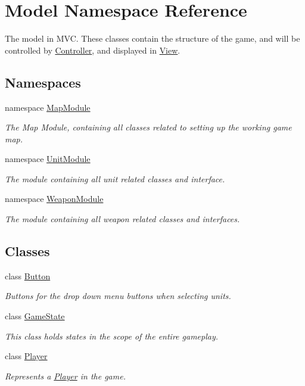 \hypertarget{namespace_model}{}\section{Model Namespace Reference}
\label{namespace_model}


The model in M\+VC. These classes contain the structure of the game, and will be controlled by \hyperlink{namespace_controller}{Controller}, and displayed in \hyperlink{namespace_view}{View}.  


\subsection*{Namespaces}
\begin{DoxyCompactItemize}
\item 
namespace \hyperlink{namespace_model_1_1_map_module}{Map\+Module}
\begin{DoxyCompactList}\small\item\em The Map Module, containing all classes related to setting up the working game map. \end{DoxyCompactList}\item 
namespace \hyperlink{namespace_model_1_1_unit_module}{Unit\+Module}
\begin{DoxyCompactList}\small\item\em The module containing all unit related classes and interface. \end{DoxyCompactList}\item 
namespace \hyperlink{namespace_model_1_1_weapon_module}{Weapon\+Module}
\begin{DoxyCompactList}\small\item\em The module containing all weapon related classes and interfaces. \end{DoxyCompactList}\end{DoxyCompactItemize}
\subsection*{Classes}
\begin{DoxyCompactItemize}
\item 
class \hyperlink{class_model_1_1_button}{Button}
\begin{DoxyCompactList}\small\item\em Buttons for the drop down menu buttons when selecting units. \end{DoxyCompactList}\item 
class \hyperlink{class_model_1_1_game_state}{Game\+State}
\begin{DoxyCompactList}\small\item\em This class holds states in the scope of the entire gameplay. \end{DoxyCompactList}\item 
class \hyperlink{class_model_1_1_player}{Player}
\begin{DoxyCompactList}\small\item\em Represents a \hyperlink{class_model_1_1_player}{Player} in the game. \end{DoxyCompactList}\end{DoxyCompactItemize}
